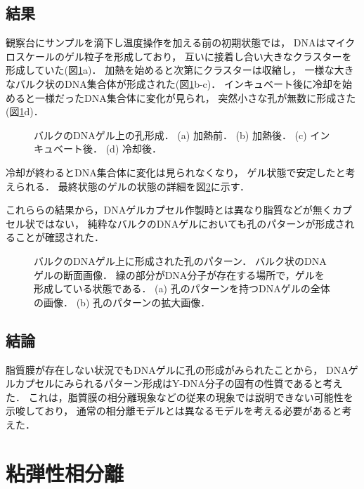 \subsection{結果}
観察台にサンプルを滴下し温度操作を加える前の初期状態では，
DNAはマイクロスケールのゲル粒子を形成しており，
互いに接着し合い大きなクラスターを形成していた(図\ref{fig:result_dnagel_formation}a)．%
加熱を始めると次第にクラスターは収縮し，
一様な大きなバルク状のDNA集合体が形成された(図\ref{fig:result_dnagel_formation}b-c)．
インキュベート後に冷却を始めると一様だったDNA集合体に変化が見られ，
突然小さな孔が無数に形成さた(図\ref{fig:result_dnagel_formation}d)．

\begin{figure}
\centering

\caption{バルクのDNAゲル上の孔形成．
    (a) 加熱前．
    (b) 加熱後．
    (c) インキュベート後．
    (d) 冷却後．
}

\label{fig:result_dnagel_formation}
\end{figure}

冷却が終わるとDNA集合体に変化は見られなくなり，
ゲル状態で安定したと考えられる．
最終状態のゲルの状態の詳細を図\ref{fig:result_dnagel}に示す．

これららの結果から，DNAゲルカプセル作製時とは異なり脂質などが無くカプセル状ではない，
純粋なバルクのDNAゲルにおいても孔のパターンが形成されることが確認された．

\begin{figure}
\centering

\caption{バルクのDNAゲル上に形成された孔のパターン．
    バルク状のDNAゲルの断面画像．
    緑の部分がDNA分子が存在する場所で，ゲルを形成している状態である．
    (a) 孔のパターンを持つDNAゲルの全体の画像．
    (b) 孔のパターンの拡大画像．
}

\label{fig:result_dnagel}
\end{figure}

\subsection{結論}
脂質膜が存在しない状況でもDNAゲルに孔の形成がみられたことから，
DNAゲルカプセルにみられるパターン形成はY-DNA分子の固有の性質であると考えた．
これは，脂質膜の相分離現象などの従来の現象では説明できない可能性を示唆しており，
通常の相分離モデルとは異なるモデルを考える必要があると考えた．

\section{粘弾性相分離}

